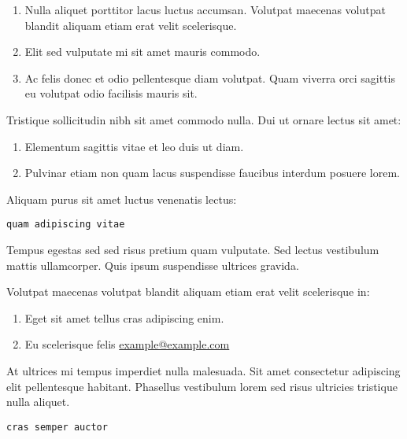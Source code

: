 \documentclass[9pt]{innovativeinnovation-cheatsheet}
\begin{document}
\begin{multicols*}{3}
\begin{enumerate}
  \item Nulla aliquet porttitor lacus luctus accumsan. Volutpat maecenas
        volutpat blandit aliquam etiam erat velit scelerisque.
  \item Elit sed vulputate mi sit amet mauris commodo.
  \item Ac felis donec et odio pellentesque diam volutpat. Quam viverra orci
        sagittis eu volutpat odio facilisis mauris sit.
\end{enumerate}


Tristique sollicitudin nibh sit amet commodo nulla. Dui ut ornare lectus
sit amet:

\begin{enumerate}
  \item Elementum sagittis vitae et leo duis ut diam.
  \item Pulvinar etiam non quam lacus suspendisse faucibus interdum posuere
        lorem.
\end{enumerate}

Aliquam purus sit amet luctus venenatis lectus:

\begin{lstlisting}
quam adipiscing vitae
\end{lstlisting}


 Tempus egestas sed sed risus pretium quam vulputate. Sed lectus vestibulum
 mattis ullamcorper. Quis ipsum suspendisse ultrices gravida.

Volutpat maecenas volutpat blandit aliquam etiam erat velit scelerisque in:

\begin{enumerate}
  \item Eget sit amet tellus cras adipiscing enim.
  \item Eu scelerisque felis
        \href{mailto://example@example.com}{example@example.com}
\end{enumerate}


At ultrices mi tempus imperdiet nulla malesuada. Sit amet consectetur
adipiscing elit pellentesque habitant. Phasellus vestibulum lorem sed risus
ultricies tristique nulla aliquet.

\begin{lstlisting}
cras semper auctor
\end{lstlisting}


\end{multicols*}
\end{document}
